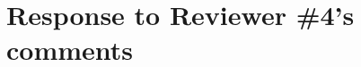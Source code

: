 \documentclass[11pt,letterpaper]{report}
\begin{document}
\begin{enumerate}[label=\textit{1.\arabic*},wide, labelwidth=!, labelindent=0pt]







\end{enumerate}

\clearpage

\section*{Response to Reviewer \#4's comments}
\label{rev4}
\end{document}
